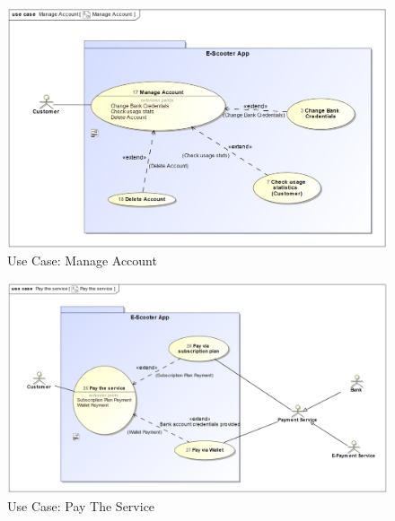 \documentclass[a4paper, 12pt]{article}
\begin{document}
\begin{figure} [htbp]
  \begin{center}
    \includegraphics[scale=0.6]{images/UseCases/ManageAccount.png}
  \end{center}
  \caption{Use Case: Manage Account}
\end{figure}

\begin{figure} [htbp]
  \begin{center}
    \includegraphics[scale=0.58]{images/UseCases/PayTheService.png}
  \end{center}
  \caption{Use Case: Pay The Service}
\end{figure}
\end{document}
